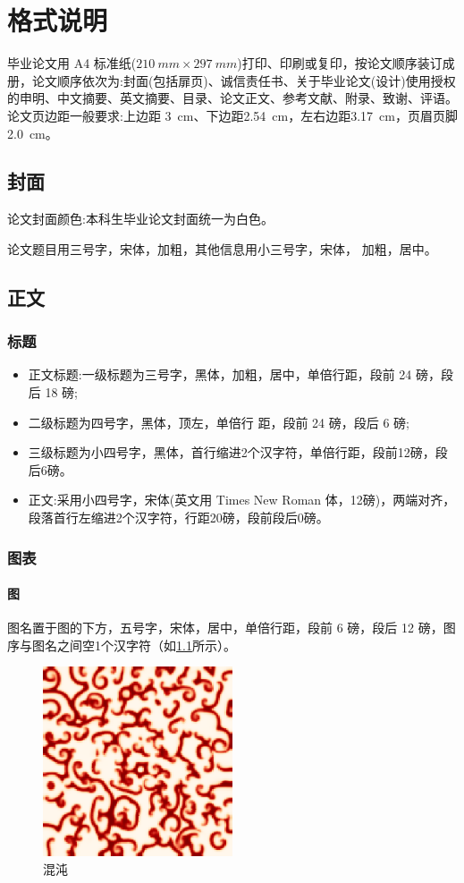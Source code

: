 \documentclass{LZU}
\begin{document}
\chapter{格式说明}
\label{chp:format}
毕业论文用 A4 标准纸($\SI{210}{mm}\times \SI{297}{mm}$)打印、印刷或复印，按论文顺序装订成册，论文顺序依次为:封面(包括扉页)、诚信责任书、关于毕业论文(设计)使用授权的申明、中文摘要、英文摘要、目录、论文正文、参考文献、附录、致谢、评语。论文页边距一般要求:上边距 \SI{3}{cm}、下边距\SI{2.54}{cm}，左右边距\SI{3.17}{cm}，页眉页脚\SI{2.0}{cm}。
\section{封面}
论文封面颜色:本科生毕业论文封面统一为白色。

论文题目用三号字，宋体，加粗，其他信息用小三号字，宋体， 加粗，居中。
\section{正文}
\subsection{标题}
\begin{itemize}
    \item 正文标题:一级标题为三号字，黑体，加粗，居中，单倍行距，段前 24 磅，段后 18 磅;
    \item 二级标题为四号字，黑体，顶左，单倍行 距，段前 24 磅，段后 6 磅;
    \item 三级标题为小四号字，黑体，首行缩进2个汉字符，单倍行距，段前12磅，段后6磅。
    \item 正文:采用小四号字，宋体(英文用 Times New Roman 体，12磅)，两端对齐，段落首行左缩进2个汉字符，行距20磅，段前段后0磅。
\end{itemize}

\subsection{图表}
\subsubsection{图}
\label{ssub:figure}
图名置于图的下方，五号字，宋体，居中，单倍行距，段前 6 磅，段后 12 磅，图序与图名之间空1个汉字符（如\cref{fig:chaos}所示）。
\begin{figure}
    \centering
    \includegraphics[width=0.5\textwidth]{pic/chaos.png}
    \caption{混沌}
    \label{fig:chaos}
\end{figure}
\end{document}
